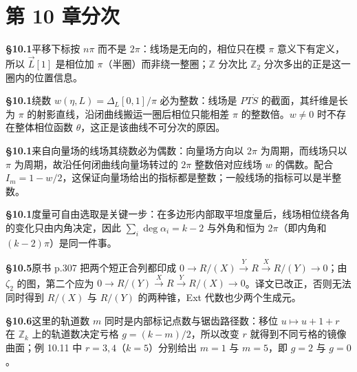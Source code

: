 \section*{第 10 章\quad 分次}
\noindent\textbf{§10.1}\quad 平移下标按 $n\pi$ 而不是 $2\pi$：线场是无向的，相位只在模 $\pi$ 意义下有定义，所以 $\vec L[1]$ 是相位加 $\pi$（半圈）而非绕一整圈；$\mathbb Z$ 分次比 $\mathbb Z_2$ 分次多出的正是这一圈内的位置信息。\par\medskip
\noindent\textbf{§10.1}\quad 绕数 $w(\eta,L)=\Delta_L[0,1]/\pi$ 必为整数：线场是 $P T\dot S$ 的截面，其纤维是长为 $\pi$ 的射影直线，沿闭曲线搬运一圈后相位只能相差 $\pi$ 的整数倍。$w\ne0$ 时不存在整体相位函数 $\theta$，这正是该曲线不可分次的原因。\par\medskip
\noindent\textbf{§10.1}\quad 来自向量场的线场其绕数必为偶数：向量场方向以 $2\pi$ 为周期，而线场只以 $\pi$ 为周期，故沿任何闭曲线向量场转过的 $2\pi$ 整数倍对应线场 $w$ 的偶数。配合 $I_m=1-w/2$，这保证向量场给出的指标都是整数；一般线场的指标可以是半整数。\par\medskip
\noindent\textbf{§10.1}\quad 度量可自由选取是关键一步：在多边形内部取平坦度量后，线场相位绕各角的变化只由内角决定，因此 $\sum_i\deg\alpha_i=k-2$ 与外角和恒为 $2\pi$（即内角和 $(k-2)\pi$）是同一件事。\par\medskip
\noindent\textbf{§10.5}\quad 原书 p.307 把两个短正合列都印成 $0\to R/(X)\xrightarrow{Y}R\xrightarrow{X}R/(Y)\to0$；由 $\zeta_2$ 的图，第二个应为 $0\to R/(Y)\xrightarrow{X}R\xrightarrow{Y}R/(X)\to0$。译文已改正，否则无法同时得到 $R/(X)$ 与 $R/(Y)$ 的两种锥，Ext 代数也少两个生成元。\par\medskip
\noindent\textbf{§10.6}\quad 这里的轨道数 $m$ 同时是内部标记点数与锯齿路径数：移位 $u\mapsto u+1+r$ 在 $\mathbb Z_k$ 上的轨道数决定亏格 $g=(k-m)/2$，所以改变 $r$ 就得到不同亏格的镜像曲面；例 10.11 中 $r=3,4$（$k=5$）分别给出 $m=1$ 与 $m=5$，即 $g=2$ 与 $g=0$。\par\medskip
